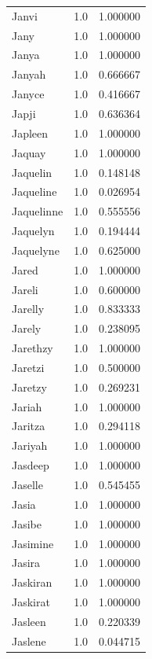 \documentclass[
  letterpaper,
  DIV=11,
  numbers=noendperiod]{scrreprt}
\begin{document}
\begin{tabular}{lrr}
Janvi           &   1.0 &   1.000000 \\
Jany            &   1.0 &   1.000000 \\
Janya           &   1.0 &   1.000000 \\
Janyah          &   1.0 &   0.666667 \\
Janyce          &   1.0 &   0.416667 \\
Japji           &   1.0 &   0.636364 \\
Japleen         &   1.0 &   1.000000 \\
Jaquay          &   1.0 &   1.000000 \\
Jaquelin        &   1.0 &   0.148148 \\
Jaqueline       &   1.0 &   0.026954 \\
Jaquelinne      &   1.0 &   0.555556 \\
Jaquelyn        &   1.0 &   0.194444 \\
Jaquelyne       &   1.0 &   0.625000 \\
Jared           &   1.0 &   1.000000 \\
Jareli          &   1.0 &   0.600000 \\
Jarelly         &   1.0 &   0.833333 \\
Jarely          &   1.0 &   0.238095 \\
Jarethzy        &   1.0 &   1.000000 \\
Jaretzi         &   1.0 &   0.500000 \\
Jaretzy         &   1.0 &   0.269231 \\
Jariah          &   1.0 &   1.000000 \\
Jaritza         &   1.0 &   0.294118 \\
Jariyah         &   1.0 &   1.000000 \\
Jasdeep         &   1.0 &   1.000000 \\
Jaselle         &   1.0 &   0.545455 \\
Jasia           &   1.0 &   1.000000 \\
Jasibe          &   1.0 &   1.000000 \\
Jasimine        &   1.0 &   1.000000 \\
Jasira          &   1.0 &   1.000000 \\
Jaskiran        &   1.0 &   1.000000 \\
Jaskirat        &   1.0 &   1.000000 \\
Jasleen         &   1.0 &   0.220339 \\
Jaslene         &   1.0 &   0.044715 \\

\end{tabular}
\end{document}
